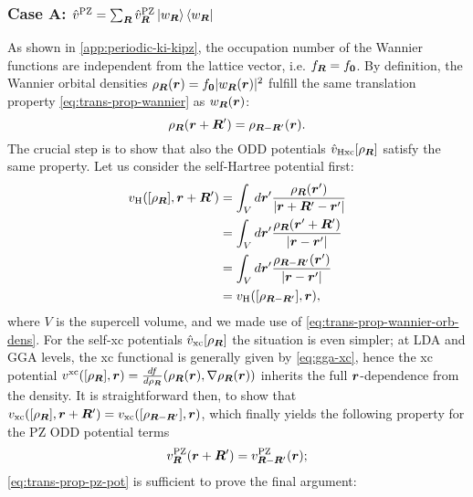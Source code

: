 \subsubsection*{Case A: $\hat{v}^{\rm PZ} = \sum_{{\bm R}} \hat{v}^{\rm PZ}_{{\bm R}} \ket{w_{{\bm R}}} \bra{w_{{\bm R}}}$}
As shown in \cref{app:periodic-ki-kipz}, the occupation number of the Wannier functions are independent from the lattice vector, i.e. $f_{{\bm R}} = f_{\bm 0}$. By definition, the Wannier orbital densities $\rho_{{\bm R}}({\bm r}) = f_{\bm 0} |w_{{\bm R}}({\bm r})|^2$ fulfill the same translation property \eqref{eq:trans-prop-wannier} as $w_{{\bm R}}({\bm r})$:
%
\begin{equation}
    \rho_{{\bm R}}({\bm r} + {\bm R}') = \rho_{{\bm R} - {\bm R}'}({\bm r}) .
    \label{eq:trans-prop-wannier-orb-dens}
\end{equation}
%
The crucial step is to show that also the ODD potentials $\hat{v}_{\rm Hxc}[\rho_{{\bm R}}]$ satisfy the same property. Let us consider the self-Hartree potential first:
%
\begin{equation}
    \begin{split}
        v_{\rm H}([\rho_{{\bm R}}],{\bm r} + {\bm R}') & = \int_V d{\bm r}' \frac{\rho_{{\bm R}}({\bm r}')}{|{\bm r} + {\bm R}' - {\bm r}'|} \\ 
        & = \int_V d{\bm r}' \frac{\rho_{{\bm R}}({\bm r}' + {\bm R}')}{|{\bm r} - {\bm r}'|} \\
        & = \int_V d{\bm r}' \frac{\rho_{{\bm R} - {\bm R}'}({\bm r}')}{|{\bm r} - {\bm r}'|} \\
        & = v_{\rm H}([\rho_{{\bm R} - {\bm R}'}],{\bm r}) ,
    \end{split}
    \label{eq:trans-prop-hartree-pot}
\end{equation}
%
where $V$ is the supercell volume, and we made use of \cref{eq:trans-prop-wannier-orb-dens}. For the self-xc potentials $\hat{v}_{\rm xc}[\rho_{{\bm R}}]$ the situation is even simpler; at LDA and GGA levels, the xc functional is generally given by \cref{eq:gga-xc}, hence the xc potential $v^{\rm xc}([\rho_{{\bm R}}],{\bm r}) = \frac{df}{d\rho_{{\bm R}}}(\rho_{{\bm R}}({\bm r}), \nabla\rho_{{\bm R}}({\bm r}))$ inherits the full ${\bm r}$-dependence from the density. It is straightforward then, to show that $v_{\rm xc}([\rho_{{\bm R}}],{\bm r} + {\bm R}') = v_{\rm xc}([\rho_{{\bm R} - {\bm R}'}],{\bm r})$, which finally yields the following property for the PZ ODD potential terms
%
\begin{equation}
    v^{\rm PZ}_{{\bm R}}({\bm r} + {\bm R}') = v^{\rm PZ}_{{\bm R} - {\bm R}'}({\bm r}) ;
    \label{eq:trans-prop-pz-pot}
\end{equation}
%
\cref{eq:trans-prop-pz-pot} is sufficient to prove the final argument:
%
